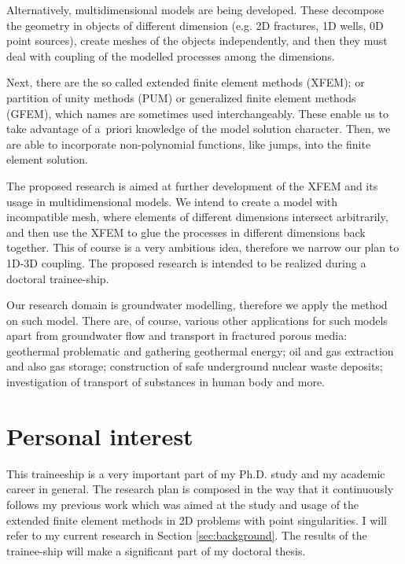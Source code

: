 \documentclass{sna}
\begin{document}
Alternatively, multidimensional models are being developed. These decompose the geometry
in objects of different dimension (e.g. 2D fractures, 1D wells, 0D point sources), create meshes of the objects independently,
and then they must deal with coupling of the modelled processes among the dimensions. 

Next, there are the so called extended finite element methods (XFEM); or partition of unity methods (PUM) or generalized
finite element methods (GFEM), which names are sometimes used interchangeably. 
These enable us to take advantage of a~priori knowledge of the model solution character.
Then, we are able to incorporate non-polynomial functions, like jumps, into the finite element solution.
\newline{}

The proposed research is aimed at further development of the XFEM and its usage in multidimensional models. 
We intend to create a model with incompatible mesh, where elements of different dimensions intersect
arbitrarily, and then use the XFEM to glue the processes in different dimensions back together. This of course is a very ambitious
idea, therefore we narrow our plan to 1D-3D coupling. 
The proposed research is intended to be realized during a doctoral trainee-ship. 

Our research domain is groundwater modelling, therefore we apply the method on such model.
There are, of course, various other applications for such models apart from groundwater flow and transport in fractured porous media:
geothermal problematic and gathering geothermal energy; oil and gas extraction and also gas storage;
construction of safe underground nuclear waste deposits; investigation of transport of substances in human body
and more.






\section{Personal interest}
This traineeship is a very important part of my Ph.D. study and my academic career in general.
The research plan is composed in the way that it continuously follows my previous work which was
aimed at the study and usage of the extended finite element methods in 2D problems with point singularities.
I will refer to my current research in Section \ref{sec:background}.
The results of the trainee-ship will make a significant part of my doctoral thesis.
\end{document}
